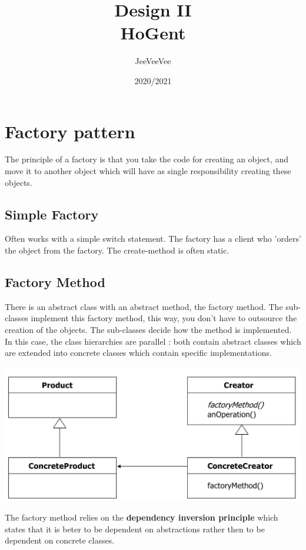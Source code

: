 \documentclass{report}
\title{Design II\\ HoGent}
\author{JeeVeeVee}
\date{2020/2021}
\begin{document}
	\maketitle
   	\tableofcontents
   	\chapter{Factory pattern}
   		The principle of a factory is that you take the code for creating an object, and move it to another object which will have as single responsibility creating these objects. 
   		\section{Simple Factory}
   			Often works with a simple switch statement. The factory has a client who 'orders' the object from the factory. The create-method is often static.
   		\section{Factory Method}
   			There is an abstract class with an abstract method, the factory method. The sub-classes implement this factory method, this way, you don't have to outsource the creation of the objects. The sub-classes decide how the method is implemented. In this case, the class hierarchies are parallel : both contain abstract classes which are extended into concrete classes which contain specific implementations.
   			\begin{center}
   				\includegraphics[scale=0.3]{factory_method}
   			\end{center}
   			The factory method relies on the \textbf{dependency inversion principle} which states that it is beter to be dependent on abstractions rather then to be dependent on concrete classes.
   			\pagebreak
\end{document}
